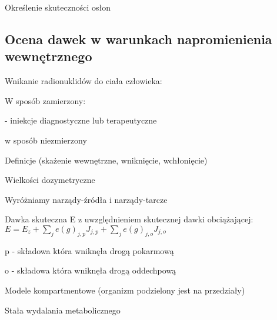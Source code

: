 \documentclass{article}
\begin{document}
Określenie skuteczności osłon

\subsection{Ocena dawek w warunkach napromienienia wewnętrznego}

Wnikanie radionuklidów do ciała człowieka:

W sposób zamierzony:

- iniekcje diagnostyczne lub terapeutyczne

w sposób niezmierzony

Definicje (skażenie wewnętrzne, wniknięcie, wchłonięcie)

Wielkości dozymetryczne

Wyróżniamy narządy-źródła i narządy-tarcze

Dawka skuteczna E z uwzględnieniem skutecznej dawki obciążającej: $E = E_z + \sum_{j}^{}e(g)_{j,p}J_{j,p} + \sum_{j}^{}e(g)_{j,o}J_{j,o}$

p - składowa która wniknęła drogą pokarmową

o - składowa która wniknęła drogą oddechpową

Modele kompartmentowe (organizm podzielony jest na przedziały)

Stała wydalania metabolicznego
\end{document}
